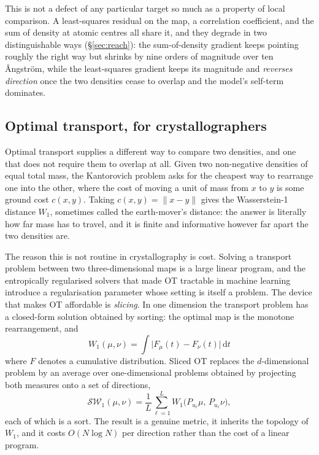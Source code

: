 \documentclass[11pt,a4paper]{article}
\newcommand{\dd}{\,\mathrm{d}}
\begin{document}
This is not a defect of any particular target so much as a property of local comparison.
A least-squares residual on the map, a correlation coefficient, and the sum of density at
atomic centres all share it, and they degrade in two distinguishable ways
(\S\ref{sec:reach}): the sum-of-density gradient keeps pointing roughly the right way but
shrinks by nine orders of magnitude over ten \AA ngstr\"om, while the least-squares
gradient keeps its magnitude and \emph{reverses direction} once the two densities cease to
overlap and the model's self-term dominates.

\subsection{Optimal transport, for crystallographers}

Optimal transport supplies a different way to compare two densities, and one that does not
require them to overlap at all. Given two non-negative densities of equal total mass, the
Kantorovich problem asks for the cheapest way to rearrange one into the other, where the
cost of moving a unit of mass from $x$ to $y$ is some ground cost $c(x,y)$. Taking
$c(x,y)=\lVert x-y\rVert$ gives the Wasserstein-1 distance $W_1$, sometimes called the
earth-mover's distance: the answer is literally how far mass has to travel, and it is
finite and informative however far apart the two densities are.

The reason this is not routine in crystallography is cost. Solving a transport problem
between two three-dimensional maps is a large linear program, and the entropically
regularised solvers that made OT tractable in machine learning introduce a regularisation
parameter whose setting is itself a problem. The device that makes OT affordable is
\emph{slicing}. In one dimension the transport problem has a closed-form solution obtained
by sorting: the optimal map is the monotone rearrangement, and
\begin{equation}
W_1(\mu,\nu)=\int \bigl|F_\mu(t)-F_\nu(t)\bigr|\dd t
\label{eq:w1d}
\end{equation}
where $F$ denotes a cumulative distribution. Sliced OT replaces the $d$-dimensional problem
by an average over one-dimensional problems obtained by projecting both measures onto a set
of directions,
\begin{equation}
\mathcal{SW}_1(\mu,\nu)=\frac{1}{L}\sum_{\ell=1}^{L}
 W_1\bigl(P_{u_\ell}\mu,\,P_{u_\ell}\nu\bigr),
\label{eq:sw1}
\end{equation}
each of which is a sort. The result is a genuine metric, it inherits the topology of $W_1$,
and it costs $O(N\log N)$ per direction rather than the cost of a linear program.
\end{document}
